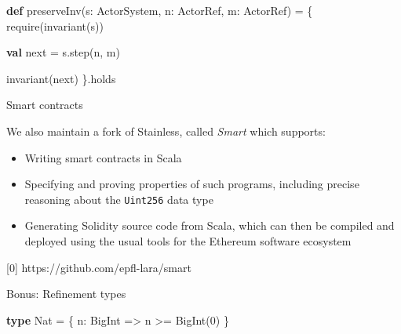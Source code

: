 \documentclass[
  ignorenonframetext,
]{beamer}
\newenvironment{Shaded}{}{}
\newcommand{\DecValTok}[1]{\textcolor[rgb]{0.25,0.63,0.44}{#1}}
\newcommand{\FunctionTok}[1]{\textcolor[rgb]{0.02,0.16,0.49}{#1}}
\newcommand{\KeywordTok}[1]{\textcolor[rgb]{0.00,0.44,0.13}{\textbf{#1}}}
\newcommand{\NormalTok}[1]{#1}
\providecommand{\tightlist}{%
  \setlength{\itemsep}{0pt}\setlength{\parskip}{0pt}}
\begin{document}
\begin{frame}[fragile]

\begin{Shaded}
\begin{Highlighting}[]
\KeywordTok{def} \FunctionTok{preserveInv}\NormalTok{(s: ActorSystem, n: ActorRef, m: ActorRef) = \{}
  \FunctionTok{require}\NormalTok{(}\FunctionTok{invariant}\NormalTok{(s))}

  \KeywordTok{val}\NormalTok{ next = s.}\FunctionTok{step}\NormalTok{(n, m)}

  \FunctionTok{invariant}\NormalTok{(next)}
\NormalTok{\}.}\FunctionTok{holds}
\end{Highlighting}
\end{Shaded}

\end{frame}

\begin{frame}[fragile]{Smart contracts}
\protect\hypertarget{smart-contracts}{}

We also maintain a fork of Stainless, called \emph{Smart} which
supports:

\begin{itemize}
\tightlist
\item
  Writing smart contracts in Scala
\item
  Specifying and proving properties of such programs, including precise
  reasoning about the \texttt{Uint256} data type
\item
  Generating Solidity source code from Scala, which can then be compiled
  and deployed using the usual tools for the Ethereum software ecosystem
\end{itemize}

{[}0{]} https://github.com/epfl-lara/smart

\end{frame}

\begin{frame}[fragile]{Bonus: Refinement types}
\protect\hypertarget{bonus-refinement-types}{}

\begin{Shaded}
\begin{Highlighting}[]
\KeywordTok{type}\NormalTok{ Nat = \{ n: BigInt => n >= }\FunctionTok{BigInt}\NormalTok{(}\DecValTok{0}\NormalTok{) \}}
\end{Highlighting}
\end{Shaded}

\end{frame}
\end{document}
